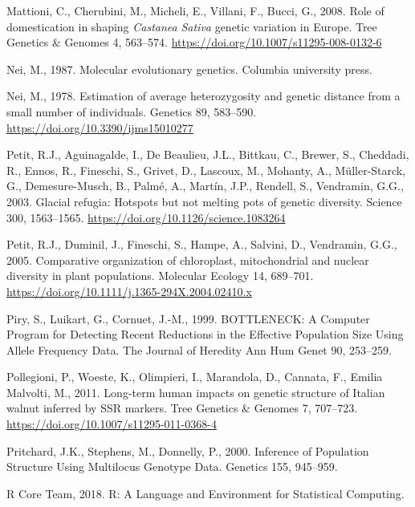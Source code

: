 \documentclass[12pt,a4paper,]{report}
\begin{document}
\leavevmode\hypertarget{ref-Mattioni2008}{}%
Mattioni, C., Cherubini, M., Micheli, E., Villani, F., Bucci, G., 2008.
Role of domestication in shaping \emph{Castanea} \emph{Sativa} genetic
variation in Europe. Tree Genetics \& Genomes 4, 563--574.
\url{https://doi.org/10.1007/s11295-008-0132-6}

\leavevmode\hypertarget{ref-nei1987molecular}{}%
Nei, M., 1987. Molecular evolutionary genetics. Columbia university
press.

\leavevmode\hypertarget{ref-Nei1978}{}%
Nei, M., 1978. Estimation of average heterozygosity and genetic distance
from a small number of individuals. Genetics 89, 583--590.
\url{https://doi.org/10.3390/ijms15010277}

\leavevmode\hypertarget{ref-Petit2003}{}%
Petit, R.J., Aguinagalde, I., De Beaulieu, J.L., Bittkau, C., Brewer,
S., Cheddadi, R., Ennos, R., Fineschi, S., Grivet, D., Lascoux, M.,
Mohanty, A., Müller-Starck, G., Demesure-Musch, B., Palmé, A., Martín,
J.P., Rendell, S., Vendramin, G.G., 2003. Glacial refugia: Hotspots but
not melting pots of genetic diversity. Science 300, 1563--1565.
\url{https://doi.org/10.1126/science.1083264}

\leavevmode\hypertarget{ref-Petit2005}{}%
Petit, R.J., Duminil, J., Fineschi, S., Hampe, A., Salvini, D.,
Vendramin, G.G., 2005. Comparative organization of chloroplast,
mitochondrial and nuclear diversity in plant populations. Molecular
Ecology 14, 689--701.
\url{https://doi.org/10.1111/j.1365-294X.2004.02410.x}

\leavevmode\hypertarget{ref-Piry1999}{}%
Piry, S., Luikart, G., Cornuet, J.-M., 1999. BOTTLENECK: A Computer
Program for Detecting Recent Reductions in the Effective Population Size
Using Allele Frequency Data. The Journal of Heredity Ann Hum Genet 90,
253--259.

\leavevmode\hypertarget{ref-Pollegioni2011}{}%
Pollegioni, P., Woeste, K., Olimpieri, I., Marandola, D., Cannata, F.,
Emilia Malvolti, M., 2011. Long-term human impacts on genetic structure
of Italian walnut inferred by SSR markers. Tree Genetics \& Genomes 7,
707--723. \url{https://doi.org/10.1007/s11295-011-0368-4}

\leavevmode\hypertarget{ref-pritchard_inference_2000}{}%
Pritchard, J.K., Stephens, M., Donnelly, P., 2000. Inference of
Population Structure Using Multilocus Genotype Data. Genetics 155,
945--959.

\leavevmode\hypertarget{ref-RCoreTeam2018}{}%
R Core Team, 2018. R: A Language and Environment for Statistical
Computing.
\end{document}
